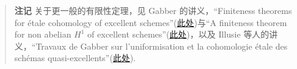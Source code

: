 \begin{quote}
\textbf{注记} 关于更一般的有限性定理，见 Gabber 的讲义，``Finiteness theorems for \'etale cohomology of excellent schemes''(\href{http://www.math.polytechnique.fr/~laszlo/gdtgabber/abelien.pdf}{此处})与``A finiteness theorem for non abelian $H^{1}$ of excellent schemes''(\href{http://www.math.polytechnique.fr/~laszlo/gdtgabber/non-abelien.pdf}{此处})，以及 Illusie 等人的讲义，``Travaux de Gabber sur l'uniformisation et la cohomologie \'etale des sch\'emas quasi-excellents''(\href{http://www.math.polytechnique.fr/~orgogozo/travaux_de_Gabber/GTG/GTG.pdf}{此处}).
\end{quote}
